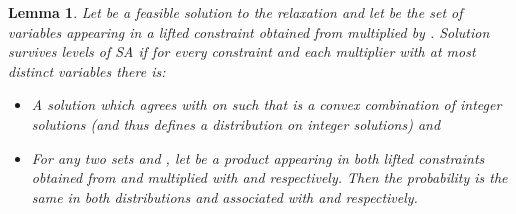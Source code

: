 \documentclass[11pt]{article}
\newtheorem{lemma}{Lemma}[section]
\begin{document}
\begin{lemma}\cite{FernandezdlVKM07,GeorgiouMagen}\label{SA-survival}
Let  be  a feasible solution to the relaxation  and let 
be  the  set  of  variables  appearing  in  a  lifted  constraint
obtained from 
multiplied by  .  Solution  survives  levels of
SA if  for every constraint   and each multiplier   with at most
 distinct variables there is:
\vspace*{-0.2cm}
\begin{itemize}
\item[1] A solution    which agrees with
    on     such that 
is a convex combination  of integer solutions  (and thus  defines a distribution on integer solutions) and
\item[2]  For   any  two  sets     and  ,  let
    be a product appearing
  in both lifted constraints obtained from  and 
  multiplied 
  with  and  respectively.  
Then
  the probability   is
  the  same in  both  distributions   and   associated  with
   and  respectively.
\end{itemize}
  \end{lemma}
\end{document}
